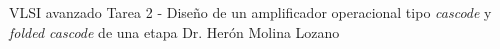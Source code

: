 




	\pnormal
	{VLSI avanzado}
	{Tarea 2 - Diseño de un amplificador operacional tipo \textit{cascode} y \textit{folded cascode} de una etapa}
	{Dr. Herón Molina Lozano}
	\tableofcontents
	
	\newpage 
	\newpage 
	\clearpage 
	\clearpage 
	\clearpage 
	\clearpage 
	
	\newpage 



